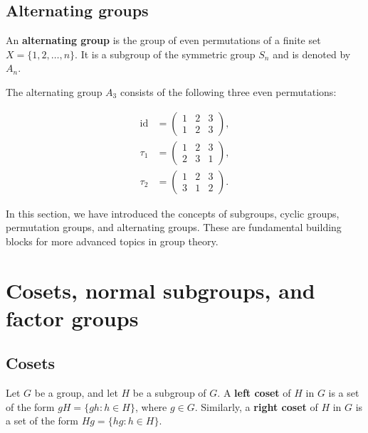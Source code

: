 \subsection{Alternating groups}

\begin{definition}

  An \textbf{alternating group} is the group of even permutations of a finite set $X = \{1, 2, \dots, n\}$. It is a subgroup of the symmetric group $S_n$ and is denoted by $A_n$.
\end{definition}

\begin{example}
  The alternating group $A_3$ consists of the following three even permutations:

  \begin{align*}
    \text{id} &= \begin{pmatrix} 1 & 2 & 3 \\ 1 & 2 & 3 \end{pmatrix}, \\
    \tau_1 &= \begin{pmatrix} 1 & 2 & 3 \\ 2 & 3 & 1 \end{pmatrix}, \\
    \tau_2 &= \begin{pmatrix} 1 & 2 & 3 \\ 3 & 1 & 2 \end{pmatrix}.
  \end{align*}
\end{example}

In this section, we have introduced the concepts of subgroups, cyclic groups, permutation groups, and alternating groups. These are fundamental building blocks for more advanced topics in group theory.


\section{Cosets, normal subgroups, and factor groups}

\subsection{Cosets}
\begin{definition}
  Let $G$ be a group, and let $H$ be a subgroup of $G$. A \textbf{left coset} of $H$ in $G$ is a set of the form $gH = \{gh : h \in H\}$, where $g \in G$. Similarly, a \textbf{right coset} of $H$ in $G$ is a set of the form $Hg = \{hg : h \in H\}$.
\end{definition}

